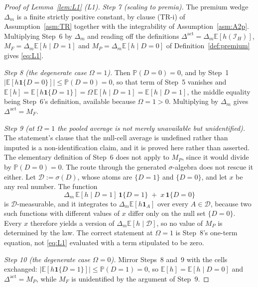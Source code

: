 \documentclass[11pt]{article}
\newcommand{\Eop}{\mathbb{E}}
\newcommand{\Prb}{\mathbb{P}}
\newcommand{\ind}{\mathbf{1}}
\newcommand{\Dact}{\Delta^{\mathrm{act}}}
\begin{document}
\begin{proof}[Proof of Lemma~\ref{lem:L1} (L1)]
\emph{Step 7 (scaling to premia).} The premium wedge $\Delta_m$ is a finite strictly positive
constant, by clause (TR-i) of Assumption~\ref{asm:TR} together with the integrability of
Assumption~\ref{asm:A2p}. Multiplying Step~6 by $\Delta_m$ and reading off the definitions
$\Dact = \Delta_m\Eop[h(\mathcal I_H)]$, $M_F = \Delta_m\Eop[h \mid D=1]$ and
$M_P = \Delta_m\Eop[h \mid D=0]$ of Definition~\ref{def:premium} gives \eqref{eq:L1}.

\emph{Step 8 (the degenerate case $\Omega = 1$).} Then $\Prb(D=0) = 0$, and by Step~1
$\bigl|\Eop[h\ind\{D=0\}]\bigr| \le \Prb(D=0) = 0$, so that term of Step~5 vanishes and
$\Eop[h] = \Eop[h\ind\{D=1\}] = \Omega\,\Eop[h \mid D=1] = \Eop[h \mid D=1]$, the middle equality
being Step~6's definition, available because $\Omega = 1 > 0$. Multiplying by $\Delta_m$ gives
$\Dact = M_F$.

\emph{Step 9 (at $\Omega=1$ the pooled average is not merely unavailable but unidentified).} The
statement's clause that the null-cell average is undefined rather than imputed is a
non-identification claim, and it is proved here rather than asserted. The elementary definition of
Step~6 does not apply to $M_P$, since it would divide by $\Prb(D=0)=0$. The route through the
generated $\sigma$-algebra does not rescue it either. Let $\mathcal D := \sigma(D)$, whose atoms are
$\{D=1\}$ and $\{D=0\}$, and let $x$ be any real number. The function
\begin{equation}
\label{eq:L1-version}
\Delta_m\,\Eop[h \mid D=1]\,\ind\{D=1\} \;+\; x\,\ind\{D=0\}
\end{equation}
is $\mathcal D$-measurable, and it integrates to $\Delta_m\Eop[h\ind_A]$ over every $A \in \mathcal
D$, because two such functions with different values of $x$ differ only on the null set $\{D=0\}$.
Every $x$ therefore yields a version of $\Delta_m\Eop[h \mid \mathcal D]$, so no value of $M_P$ is
determined by the law. The correct statement at $\Omega=1$ is Step~8's one-term equation, not
\eqref{eq:L1} evaluated with a term stipulated to be zero.

\emph{Step 10 (the degenerate case $\Omega = 0$).} Mirror Steps~8 and~9 with the cells exchanged:
$\bigl|\Eop[h\ind\{D=1\}]\bigr| \le \Prb(D=1) = 0$, so $\Eop[h] = \Eop[h \mid D=0]$ and
$\Dact = M_P$, while $M_F$ is unidentified by the argument of Step~9.


\end{proof}
\end{document}
